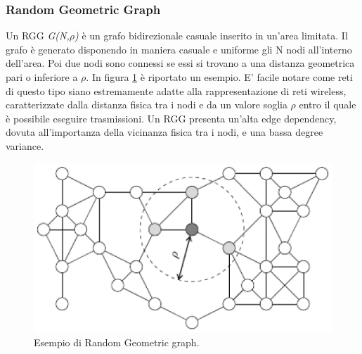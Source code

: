\subsubsection{Random Geometric Graph}
\label{subsubsec:rgg}
Un \acf{RGG} \textit{G(N,$ \rho $)} è un grafo bidirezionale casuale inserito in un'area limitata. Il grafo è generato disponendo in maniera casuale e uniforme gli N nodi all'interno dell'area. Poi due nodi sono connessi se essi si trovano a una distanza geometrica pari o inferiore a \textit{$ \rho $}. In figura \ref{fig:RandomGeometricGraph} è riportato un esempio. E' facile notare come reti di questo tipo siano estremamente adatte alla rappresentazione di reti wireless, caratterizzate dalla distanza fisica tra i nodi e da un valore soglia \textit{$ \rho $} entro il quale è possibile eseguire trasmissioni. Un \acs{RGG} presenta un'alta edge dependency, dovuta all'importanza della vicinanza fisica tra i nodi, e una bassa degree variance.
\bigskip
\begin{figure}[h]
	\centering
	\includegraphics[width=0.7\linewidth,keepaspectratio]{Images/reti/RandomGeometricGraph}
	\caption[Random Geometric Grah]{Esempio di Random Geometric graph\cite{comparisonGAonRT2014-ita}.}
	\label{fig:RandomGeometricGraph}
\end{figure}
\bigskip

